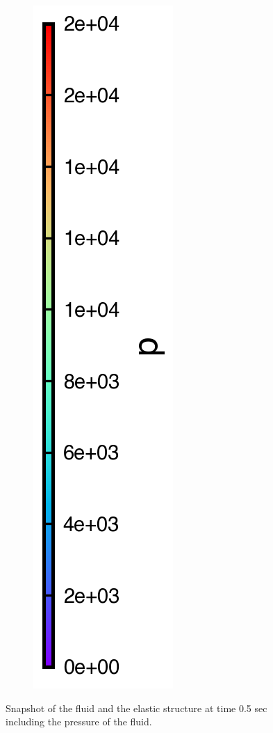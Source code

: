 \begin{figure}[!htpb]
\begin{subfigure}{0.48\textwidth}
  \end{subfigure}
  \begin{subfigure}{0.48\textwidth}
    \centering
    \includegraphics[scale=1.0]{figures/fsi/figures/ng_2020_hydrostatic_water_column_on_elastic_plate/colorbar_t_0}
  \end{subfigure}
  \caption{ Snapshot of the fluid and the elastic structure at time 0.5 sec
   including the pressure of the fluid.}
\label{fig:snapshot-hs-fsi}
\end{figure}
